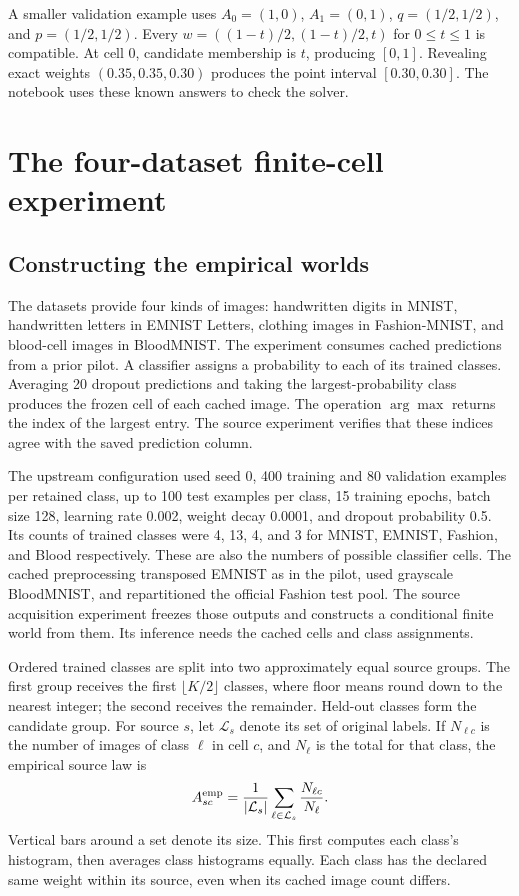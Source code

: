 \documentclass[11pt,a4paper]{report}
\begin{document}
A smaller validation example uses $A_0=(1,0)$, $A_1=(0,1)$, $q=(1/2,1/2)$, and $p=(1/2,1/2)$. Every $w=((1-t)/2,(1-t)/2,t)$ for $0\leq t\leq1$ is compatible. At cell 0, candidate membership is $t$, producing $[0,1]$. Revealing exact weights $(0.35,0.35,0.30)$ produces the point interval $[0.30,0.30]$. The notebook uses these known answers to check the solver.

\chapter{The four-dataset finite-cell experiment}
\section{Constructing the empirical worlds}
The datasets provide four kinds of images: handwritten digits in MNIST, handwritten letters in EMNIST Letters, clothing images in Fashion-MNIST, and blood-cell images in BloodMNIST. The experiment consumes cached predictions from a prior pilot. A classifier assigns a probability to each of its trained classes. Averaging 20 dropout predictions and taking the largest-probability class produces the frozen cell of each cached image. The operation $\arg\max$ returns the index of the largest entry. The source experiment verifies that these indices agree with the saved prediction column.

The upstream configuration used seed 0, 400 training and 80 validation examples per retained class, up to 100 test examples per class, 15 training epochs, batch size 128, learning rate 0.002, weight decay 0.0001, and dropout probability 0.5. Its counts of trained classes were 4, 13, 4, and 3 for MNIST, EMNIST, Fashion, and Blood respectively. These are also the numbers of possible classifier cells. The cached preprocessing transposed EMNIST as in the pilot, used grayscale BloodMNIST, and repartitioned the official Fashion test pool. The source acquisition experiment freezes those outputs and constructs a conditional finite world from them. Its inference needs the cached cells and class assignments.

Ordered trained classes are split into two approximately equal source groups. The first group receives the first $\lfloor K/2\rfloor$ classes, where floor means round down to the nearest integer; the second receives the remainder. Held-out classes form the candidate group. For source $s$, let $\mathcal L_s$ denote its set of original labels. If $N_{\ell c}$ is the number of images of class $\ell$ in cell $c$, and $N_\ell$ is the total for that class, the empirical source law is
\begin{equation}
A^{\rm emp}_{sc}=\frac{1}{|\mathcal L_s|}\sum_{\ell\in\mathcal L_s}\frac{N_{\ell c}}{N_\ell}.
\end{equation}
Vertical bars around a set denote its size. This first computes each class's histogram, then averages class histograms equally. Each class has the declared same weight within its source, even when its cached image count differs.
\end{document}
